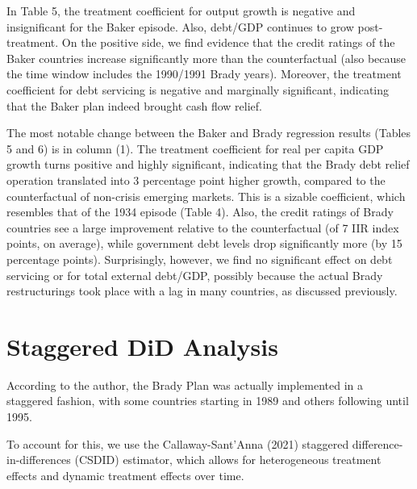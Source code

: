 In Table 5,
the treatment coefficient for output growth is negative and insignificant for the Baker
episode. Also, debt/GDP continues to grow post-treatment. On the positive side, we
find evidence that the credit ratings of the Baker countries increase significantly more
than the counterfactual (also because the time window includes the 1990/1991 Brady
years). Moreover, the treatment coefficient for debt servicing is negative and marginally
significant, indicating that the Baker plan indeed brought cash flow relief.





The most notable change between the Baker and Brady regression results (Tables 5
and 6) is in column (1). The treatment coefficient for real per capita GDP growth turns
positive and highly significant, indicating that the Brady debt relief operation translated
into 3 percentage point higher growth, compared to the counterfactual of non-crisis
emerging markets. This is a sizable coefficient, which resembles that of the 1934
episode (Table 4). Also, the credit ratings of Brady countries see a large improvement
relative to the counterfactual (of 7 IIR index points, on average), while government
debt levels drop significantly more (by 15 percentage points). Surprisingly, however,
we find no significant effect on debt servicing or for total external debt/GDP, possibly
because the actual Brady restructurings took place with a lag in many countries, as
discussed previously.



\section{Staggered DiD Analysis}
According to the author, the Brady Plan was actually implemented in a staggered
fashion, with some countries starting in 1989 and others following until 1995.

To account for this, we use the Callaway-Sant'Anna (2021) staggered difference-in-differences
(CSDID) estimator, which allows for heterogeneous treatment effects and
dynamic treatment effects over time.

